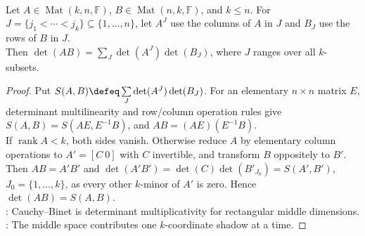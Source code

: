 \begin{theorem} \label{thm:cauchy-binet-minors} \\
Let $A\in\operatorname{Mat}(k,n,\mathbb{F})$, $B\in\operatorname{Mat}(n,k,\mathbb{F})$, and $k\leq n$. For $J=\{j_1<\cdots<j_k\}\subseteq\{1,\ldots,n\}$, let $A^J$ use the columns of $A$ in $J$ and $B_J$ use the rows of $B$ in $J$.\\
Then $\det(AB)=\sum\limits_J \det(A^J)\det(B_J)$, where $J$ ranges over all $k$-subsets.
\begin{proof}
Put $S(A,B)\defeq \sum\limits_J \det(A^J)\det(B_J)$. For an elementary $n\times n$ matrix $E$, determinant multilinearity and row/column operation rules give $S(A,B)=S(AE,E^{-1}B)$, and $AB=(AE)(E^{-1}B)$.\\
If $\operatorname{rank}A<k$, both sides vanish. Otherwise reduce $A$ by elementary column operations to $A'=[C\ 0]$ with $C$ invertible, and transform $B$ oppositely to $B'$.\\
Then $AB=A'B'$ and $\det(A'B')=\det(C)\det(B'_{J_0})=S(A',B')$, $J_0=\{1,\ldots,k\}$, as every other $k$-minor of $A'$ is zero. Hence $\det(AB)=S(A,B)$.\\
: Cauchy--Binet is determinant multiplicativity for rectangular middle dimensions.\\
: The middle space contributes one $k$-coordinate shadow at a time.
\end{proof}
\end{theorem}

